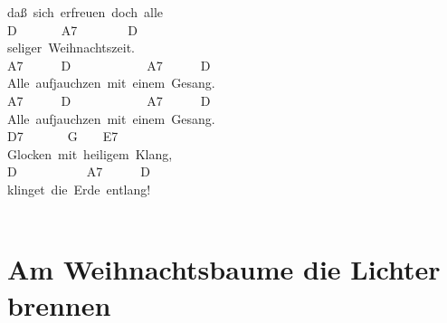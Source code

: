 \documentclass[]{book}
\let\stdsection\section
\renewcommand\section{\clearpage\stdsection}
\begin{document}
daß~sich~erfreuen~doch~alle\\
D~~~~~~~A7~~~~~~~~D\\
seliger~Weihnachtszeit.\\
A7~~~~~~D~~~~~~~~~~~~A7~~~~~~D\\
Alle~aufjauchzen~mit~einem~Gesang.\\
A7~~~~~~D~~~~~~~~~~~~A7~~~~~~D\\
Alle~aufjauchzen~mit~einem~Gesang.\\
\hspace*{0.333em}\hspace*{0.333em}\hspace*{0.333em}\hspace*{0.333em}\hspace*{0.333em}\hspace*{0.333em}\hspace*{0.333em}\hspace*{0.333em}\hspace*{0.333em}\hspace*{0.333em}\hspace*{0.333em}\hspace*{0.333em}D7~~~~~~~G~~~~E7\\
Glocken~mit~heiligem~Klang,\\
D~~~~~~~~~~~A7~~~~~~D\\
klinget~die~Erde~entlang!\\
~\\

\hypertarget{am-weihnachtsbaume-die-lichter-brennen}{%
\section{Am Weihnachtsbaume die Lichter brennen}\label{am-weihnachtsbaume-die-lichter-brennen}}
\end{document}
